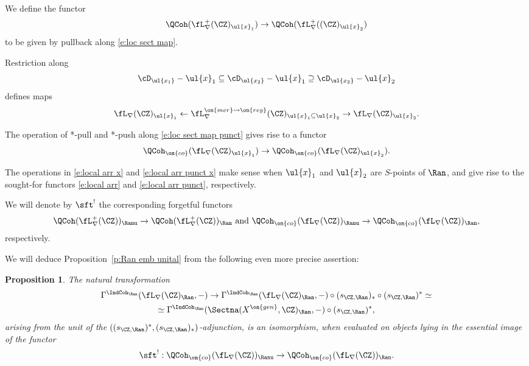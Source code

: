 \documentclass[9pt]{amsart}
\newtheorem{prop}[subsubsection]{Proposition}
\theoremstyle{remark}
\theoremstyle{definition}
\theoremstyle{remark}
\newcommand{\propref}[1]{Proposition~\ref{#1}}
\numberwithin{equation}{section}
\begin{document}
We define the functor 
\begin{equation} \label{e:local arr x}
\QCoh(\fL^+_\nabla(\CZ)_{\ul{x}_1})\to \QCoh(\fL^+_\nabla((\CZ)_{\ul{x}_2})
\end{equation} 
to be given by pullback along \eqref{e:loc sect map}. 

\sssec{} \label{sss:add unit punct}

Restriction along 
$$\cD_{\ul{x_1}}-\ul{x}_1\subseteq \cD_{\ul{x_2}}-\ul{x}_1 \supseteq \cD_{\ul{x_2}}-\ul{x}_2$$
defines maps
\begin{equation} \label{e:loc sect map punct}
\fL_\nabla(\CZ)_{\ul{x}_1} \leftarrow \fL_\nabla^{\on{mer}\rightsquigarrow \on{reg}}(\CZ)_{\ul{x}_1\subseteq \ul{x}_2}\to \fL_\nabla(\CZ)_{\ul{x}_2}.
\end{equation} 

The operation of *-pull and *-push along \eqref{e:loc sect map punct} gives rise to a functor
\begin{equation} \label{e:local arr punct x}
\QCoh_{\on{co}}(\fL_\nabla(\CZ)_{\ul{x}_1})\to \QCoh_{\on{co}}(\fL_\nabla(\CZ)_{\ul{x}_2}). 
\end{equation} 

\sssec{}

The operations in \eqref{e:local arr x} and \eqref{e:local arr punct x} make sense when $\ul{x}_1$ and $\ul{x}_2$
are $S$-points of $\Ran$, and give rise to the sought-for functors \eqref{e:local arr} and \eqref{e:local arr punct}, respectively.  

\medskip

We will denote by $\sft^!$ the corresponding forgetful functors
$$\QCoh(\fL^+_\nabla(\CZ))_\Ranu\to \QCoh(\fL^+_\nabla(\CZ))_\Ran \text{ and } \QCoh_{\on{co}}(\fL_\nabla(\CZ))_\Ranu\to \QCoh_{\on{co}}(\fL_\nabla(\CZ))_\Ran,$$
respectively. 

\sssec{}

We will deduce \propref{p:Ran emb unital} from the following even more precise assertion:

\begin{prop} \label{p:Ran emb unital local}
The natural transformation 
\begin{multline*}
\Gamma^{\IndCoh_\Ran}(\fL_\nabla(\CZ)_\Ran,-) \to \Gamma^{\IndCoh_\Ran}(\fL_\nabla(\CZ)_\Ran,-) \circ (s_{\CZ,\Ran})_* \circ (s_{\CZ,\Ran})^* \simeq \\
\simeq \Gamma^{\IndCoh_\Ran}(\Sectna(X^{\on{gen}},\CZ)_\Ran,-)\circ (s_{\CZ,\Ran})^*,
\end{multline*}
arising from the unit of the $((s_{\CZ,\Ran})^*,(s_{\CZ,\Ran})_*)$-adjunction, is an isomorphism,
when evaluated on objects lying in the essential image of the functor
$$\sft^!:\QCoh_{\on{co}}(\fL_\nabla(\CZ))_\Ranu\to \QCoh_{\on{co}}(\fL_\nabla(\CZ))_\Ran.$$
\end{prop}
\end{document}
